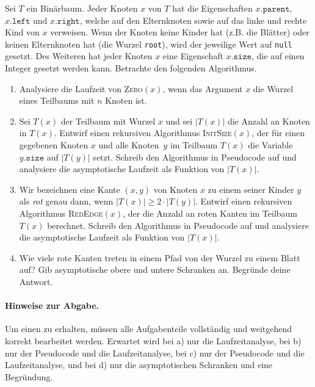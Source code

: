 \documentclass{uebung_cs}
\begin{document}
Sei $T$ ein Binärbaum.
Jeder Knoten $x$ von $T$ hat die Eigenschaften $x.\texttt{parent}$, $x.\texttt{left}$ und $x.\texttt{right}$, welche auf den Elternknoten sowie auf das linke und rechte Kind von $x$ verweisen.
Wenn der Knoten keine Kinder hat (z.B. die Blätter) oder keinen Elternknoten hat (die Wurzel \texttt{root}), wird der jeweilige Wert auf \texttt{null} gesetzt.
Des Weiteren hat jeder Knoten $x$ eine Eigenschaft $x.\texttt{size}$, die auf einen Integer gesetzt werden kann.
Betrachte den folgenden Algorithmus.
\begin{algorithmic}
    \EndIf
    \EndProcedure
\end{algorithmic}
\begin{enumerate}
    \item Analysiere die Laufzeit von \textsc{Zero}$(x)$, wenn das Argument $x$ die Wurzel eines Teilbaums mit $n$ Knoten ist.
    \item Sei $T(x)$ der Teilbaum mit Wurzel $x$ und sei $|T(x)|$ die Anzahl an Knoten in $T(x)$.
    Entwirf einen rekursiven Algorithmus \textsc{InitSize$(x)$}, der für einen gegebenen Knoten $x$ und alle Knoten~$y$ im Teilbaum $T(x)$ die Variable $y.\texttt{size}$ auf $|T(y)|$ setzt.
    Schreib den Algorithmus in Pseudocode auf und analysiere die asymptotische Laufzeit als Funktion von $|T(x)|$.
    \item Wir bezeichnen eine Kante $(x,y)$ von Knoten $x$ zu einem seiner Kinder $y$ als \emph{rot} genau dann, wenn $|T(x)| \geq 2\cdot|T(y)|$.
    Entwirf einen rekursiven Algorithmus \textsc{RedEdge$(x)$}, der die Anzahl an roten Kanten im Teilbaum $T(x)$ berechnet.
    Schreib den Algorithmus in Pseudocode auf und analysiere die asymptotische Laufzeit als Funktion von $|T(x)|$.
    \item Wie viele rote Kanten treten in einem Pfad von der Wurzel zu einem Blatt auf?
    Gib asymptotische obere und untere Schranken an. Begründe deine Antwort.
\end{enumerate}
  
  \paragraph*{Hinweise zur Abgabe.}
  Um einen  zu erhalten, müssen alle Aufgabenteile vollständig und weitgehend korrekt bearbeitet werden.
  Erwartet wird  bei a) nur die Laufzeitanalyse, bei b) nur der Pseudocode und die Laufzeitanalyse, bei c) nur der Pseudocode und die Laufzeitanalyse, und bei d) nur die asymptotischen Schranken und eine Begründung.
\end{document}
